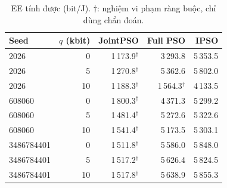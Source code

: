 \begin{table}
\centering
\renewcommand{\arraystretch}{1.16}
\setlength{\tabcolsep}{5pt}
\begin{tabular}{lrrrr}
\toprule
Seed & $q$ (kbit) & JointPSO & Full PSO & IPSO \\
\midrule
2026 & 0 & 1\,173.9$^{\dagger}$ & 3\,293.8 & 5\,353.5 \\
2026 & 5 & 1\,270.8$^{\dagger}$ & 5\,362.6 & 5\,802.0 \\
2026 & 10 & 1\,188.3$^{\dagger}$ & 1\,564.3$^{\dagger}$ & 4\,133.5 \\
608060 & 0 & 1\,800.3$^{\dagger}$ & 4\,371.3 & 5\,299.2 \\
608060 & 5 & 1\,481.4$^{\dagger}$ & 5\,272.6 & 5\,322.6 \\
608060 & 10 & 1\,541.4$^{\dagger}$ & 5\,173.5 & 5\,303.1 \\
3486784401 & 0 & 1\,511.8$^{\dagger}$ & 5\,586.0 & 5\,848.0 \\
3486784401 & 5 & 1\,517.2$^{\dagger}$ & 5\,626.4 & 5\,824.5 \\
3486784401 & 10 & 1\,517.8$^{\dagger}$ & 5\,638.9 & 5\,855.3 \\
\bottomrule
\end{tabular}
\caption{EE tính được (bit/J). $\dagger$: nghiệm vi phạm ràng buộc, chỉ dùng chẩn đoán.}
\end{table}
